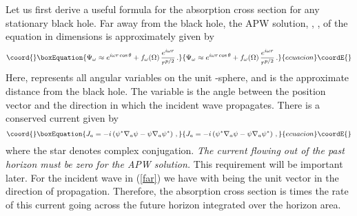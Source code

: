 \documentclass[a4paper,12pt]{article}
\begin{document}
Let us first derive a useful formula for the absorption cross section
for any stationary black hole.  
Far away from the black hole, the APW solution,
\coordHE{}, \coordHE{}, of the equation
\coordHE{}
in \coordHE{} dimensions is approximately given by
\begin{equation}\coord{}\boxEquation{
\Psi_\omega \approx e^{i\omega r\cos\theta} 
+ f_\omega(\Omega)\,\frac{e^{i\omega r}}{r^{p/2}}\,.
\label{far}
}{
\Psi_\omega \approx e^{i\omega r\cos\theta} 
+ f_\omega(\Omega)\,\frac{e^{i\omega r}}{r^{p/2}}\,.
}{ecuacion}\coordE{}\end{equation}
Here, \myHighlight{$\Omega$}\coordHE{} represents all angular variables on the unit \coordHE{}-sphere, and
\coordHE{} is the approximate
distance from the black hole.  The variable \myHighlight{$\theta$}\coordHE{} is the
angle between 
the position vector and the direction in which the incident wave propagates. 
There is a conserved current given by
\begin{equation}\coord{}\boxEquation{
J_a = -i \left( \psi^*\nabla_a \psi
- \psi \nabla_a \psi^*\right)\,, \label{jmu}
}{
J_a = -i \left( \psi^*\nabla_a \psi
- \psi \nabla_a \psi^*\right)\,, }{ecuacion}\coordE{}\end{equation}
where the star denotes complex conjugation.  {\it The current flowing out
of the {\it past}
horizon must be zero for the APW solution.}
This requirement will be important later.
For the incident wave
\coordHE{} in (\ref{far})
we have \coordHE{} with \coordHE{} being the unit vector in the
direction of propagation.  
Therefore, the absorption cross section is \coordHE{} times
the rate of this current going across the future horizon integrated over the
horizon area.
\end{document}
